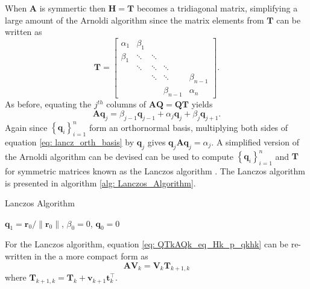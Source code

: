 When $\bm{A}$ is symmertic then $\bm{H} = \bm{T}$ becomes a tridiagonal matrix, simplifying a large amount of the Arnoldi algorithm since the matrix elements from $\bm{T}$ can be written as
\[
    \bm{T} =
    \begin{bmatrix}
        \alpha_1 & \beta_1 &        &             &             \\
        \beta_1  & \ddots  & \ddots &             &             \\
                 & \ddots  & \ddots & \ddots      &             \\
                 &         & \ddots & \ddots      & \beta_{n-1} \\
                 &         &        & \beta_{n-1} & \alpha_{n}
    \end{bmatrix}.
\]
As before, equating the $j^{th}$ columns of $\bm{A} \bm{Q} = \bm{Q} \bm{T}$ yields
\begin{equation}\label{eq: lancz_orth_basis}
    \bm{A} \bm{q}_{j} = \beta_{j-1} \bm{q}_{j-1} + \alpha_{j} \bm{q}_j + \beta_j \bm{q}_{j+1}.
\end{equation}
Again since $\left\{ \bm{q}_{i} \right\}_{i=1}^{n}$ form an orthornormal basis, multiplying both sides of equation \ref{eq: lancz_orth_basis} by $\bm{q}_j$ gives $\bm{q}_j \bm{A} \bm{q}_j = \alpha_j$. A simplified version of the Arnoldi algorithm can be devised can be used to compute $\left\{ \bm{q}_{i} \right\}_{i=1}^{n}$ and $\bm{T}$ for symmetric matrices known as the Lanczos algorithm \cite{DemmelJamesW1997Anla}. The Lanczos algorithm is presented in algorithm \ref{alg: Lanczos_Algorithm}.

{\centering
\begin{minipage}{.85\linewidth}
    \begin{algorithm}[H]
        \caption{Lanczos Algorithm}
        \label{alg: Lanczos_Algorithm}
        \SetAlgoLined
        \DontPrintSemicolon

        \BlankLine
        $\bm{q}_1 = \bm{r}_0 / \| \bm{r}_0 \|$, $\beta_0 = 0$, $\bm{q}_0 = 0$\;
        \BlankLine
    \end{algorithm}
\end{minipage}
\par
}

For the Lanczos algorithm, equation \ref{eq: QTkAQk_eq_Hk_p_qkhk} can be re-written in the a more compact form as
\begin{equation}\label{eq: AVk_eq_VkTk1k}
    \bm{A} \bm{V}_{k} = \bm{V}_{k} \bm{T}_{k+1,k}
\end{equation}
where $\bm{T}_{k+1,k} = \bm{T}_{k} + \bm{v}_{k+1} \bm{t}_{k}^{\intercal}$.